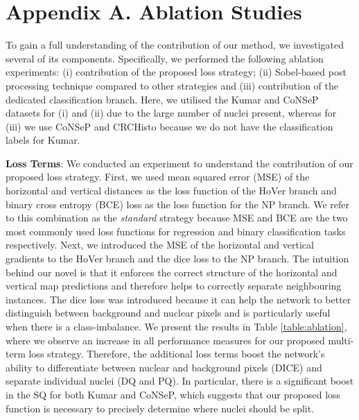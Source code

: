 \documentclass[journal]{IEEEtran}
\begin{document}
	\section*{Appendix A. Ablation Studies} 
    
	To gain a full understanding of the contribution of our method, we investigated several of its components. Specifically, we performed the following ablation experiments: (i) contribution of the proposed loss strategy; (ii) Sobel-based post processing technique compared to other strategies and (iii) contribution of the dedicated classification branch. Here, we utilised the Kumar and CoNSeP datasets for (i) and (ii) due to the large number of nuclei present, whereas for (iii) we use CoNSeP and CRCHisto because we do not have the classification labels for Kumar.
 
	\textbf{Loss Terms}: We conducted an experiment to understand the contribution of our proposed loss strategy. First, we used mean squared error (MSE) of the horizontal and vertical distances  as the loss function of the HoVer branch and binary cross entropy (BCE) loss  as the loss function for the NP branch. We refer to this combination as the \textit{standard} strategy because MSE and BCE are the two most commonly used loss functions for regression and binary classification tasks respectively. Next, we introduced the MSE of the horizontal and vertical gradients  to the HoVer branch and the dice loss  to the NP branch. The intuition behind our novel  is that it enforces the correct structure of the horizontal and vertical map predictions and therefore helps to correctly separate neighbouring instances. The dice loss was introduced because it can help the network to better distinguish between background and nuclear pixels and is particularly useful when there is a class-imbalance. We present the results in Table \ref{table:ablation}, where we observe an increase in all performance measures for our proposed multi-term loss strategy. Therefore, the additional loss terms boost the network's ability to differentiate between nuclear and background pixels (DICE) and separate individual nuclei (DQ and PQ). In particular, there is a significant boost in the SQ for both Kumar and CoNSeP, which suggests that our proposed loss function  is necessary to precisely determine where nuclei should be split.
	
\end{document}
